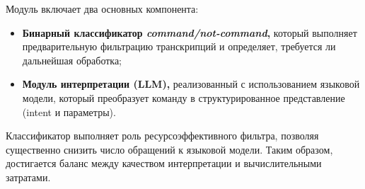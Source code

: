 Модуль включает два основных компонента:

\begin{itemize}
    \item \textbf{Бинарный классификатор \textit{command/not-command},}
    который выполняет предварительную фильтрацию транскрипций и определяет, требуется ли дальнейшая обработка;

    \item \textbf{Модуль интерпретации (LLM),}
    реализованный с использованием языковой модели, который преобразует команду в структурированное представление (intent и параметры).
\end{itemize}

Классификатор выполняет роль ресурсоэффективного фильтра, позволяя существенно снизить число обращений к языковой модели.
Таким образом, достигается баланс между качеством интерпретации и вычислительными затратами.
